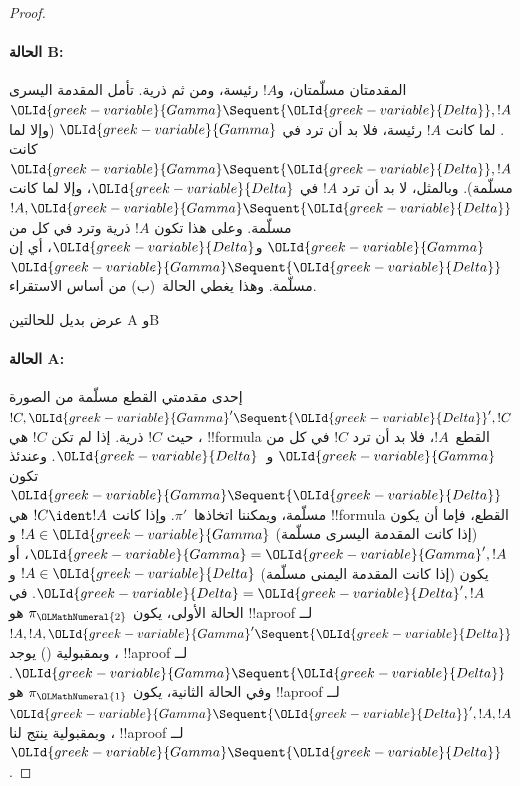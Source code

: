 \documentclass[../../../include/open-logic-section]{subfiles}
\begin{document}
\begin{proof}
\paragraph{الحالة B:} المقدمتان مسلّمتان، و$!A$ رئيسة، ومن ثم ذرية. تأمل
المقدمة اليسرى ${\OLId{greek-variable}{Gamma}} \Sequent {\OLId{greek-variable}{Delta}}, !A$. لما كانت $!A$ رئيسة، فلا بد
أن ترد في ${\OLId{greek-variable}{Gamma}}$ (وإلا لما كانت ${\OLId{greek-variable}{Gamma}} \Sequent {\OLId{greek-variable}{Delta}}, !A$ مسلّمة).
وبالمثل، لا بد أن ترد $!A$ في ${\OLId{greek-variable}{Delta}}$، وإلا لما كانت $!A, {\OLId{greek-variable}{Gamma}}
\Sequent {\OLId{greek-variable}{Delta}}$ مسلّمة. وعلى هذا تكون $!A$ ذرية وترد في كل من ${\OLId{greek-variable}{Gamma}}$
و${\OLId{greek-variable}{Delta}}$، أي إن ${\OLId{greek-variable}{Gamma}} \Sequent {\OLId{greek-variable}{Delta}}$ مسلّمة. وهذا يغطي الحالة~(ب)
من أساس الاستقراء.

\begin{center}
عرض بديل للحالتين A وB
\end{center}

\paragraph{الحالة A:} إحدى مقدمتي القطع مسلّمة من الصورة $!C, {\OLId{greek-variable}{Gamma}}'
\Sequent {\OLId{greek-variable}{Delta}}', !C$، حيث $!C$ ذرية. إذا لم تكن $!C$ هي !!{formula}
القطع~$!A$، فلا بد أن ترد $!C$ في كل من ${\OLId{greek-variable}{Gamma}}$ و~${\OLId{greek-variable}{Delta}}$. وعندئذ تكون
${\OLId{greek-variable}{Gamma}} \Sequent {\OLId{greek-variable}{Delta}}$ مسلّمة، ويمكننا اتخاذها~$\pi'$. وإذا كانت
$!C\ident !A$ هي !!{formula} القطع، فإما أن يكون (إذا كانت المقدمة اليسرى
مسلّمة) $!A\in{\OLId{greek-variable}{Gamma}}$ و${\OLId{greek-variable}{Gamma}}={\OLId{greek-variable}{Gamma}}', !A$، أو يكون (إذا كانت المقدمة
اليمنى مسلّمة) $!A\in{\OLId{greek-variable}{Delta}}$ و${\OLId{greek-variable}{Delta}}={\OLId{greek-variable}{Delta}}', !A$. في الحالة الأولى،
يكون $\pi_{\OLMathNumeral{2}}$ هو !!a{proof} لــ$!A, !A, {\OLId{greek-variable}{Gamma}}' \Sequent {\OLId{greek-variable}{Delta}}$، وبمقبولية
\LeftR{\Contraction} () يوجد !!a{proof}
لــ${\OLId{greek-variable}{Gamma}} \Sequent {\OLId{greek-variable}{Delta}}$. وفي الحالة الثانية، يكون $\pi_{\OLMathNumeral{1}}$ هو
!!a{proof} لــ${\OLId{greek-variable}{Gamma}} \Sequent {\OLId{greek-variable}{Delta}}', !A, !A$، وبمقبولية
\RightR{\Contraction} ينتج لنا !!a{proof} لــ${\OLId{greek-variable}{Gamma}} \Sequent {\OLId{greek-variable}{Delta}}$.


\end{proof}
\end{document}
